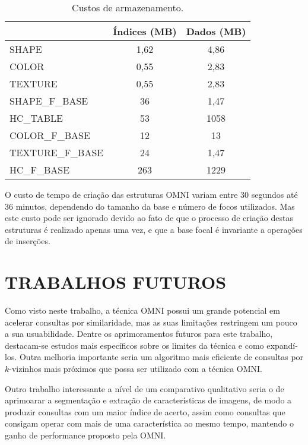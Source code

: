 \begin{table}[H]
    \centering
    \caption[Custos de armazenamento]{Custos de armazenamento.
    \label{tab:custos}}
   \begin{tabular}{l c c}
        \toprule
             &Índices (MB)& Dados (MB)\\
        \midrule
            SHAPE & 1,62& 4,86 \\
            COLOR & 0,55& 2,83 \\
            TEXTURE & 0,55& 2,83 \\
            SHAPE\_F\_BASE & 36& 1,47 \\
            HC\_TABLE & 53& 1058 \\
            COLOR\_F\_BASE & 12& 13 \\
            TEXTURE\_F\_BASE & 24& 1,47 \\
            HC\_F\_BASE & 263& 1229 \\
        \bottomrule
    \end{tabular}
\end{table}

O custo de tempo de criação das estruturas OMNI variam entre 30 segundos até 36 minutos, dependendo do tamanho da base e número de focos
utilizados. Mas este custo pode ser ignorado devido ao fato de que o processo de criação destas estruturas é realizado apenas uma vez,
e que a base focal é invariante a operações de inserções.

\section{TRABALHOS FUTUROS}
\label{sec:trabalhosFuturos}

Como visto neste trabalho, a técnica OMNI possui um grande potencial em acelerar consultas por similaridade, mas as suas limitações restringem um pouco a sua usuabilidade. Dentre os aprimoramentos futuros para este trabalho, destacam-se estudos mais específicos
sobre os limites da técnica e como expandí-los. Outra melhoria importante seria um algoritmo mais eficiente de consultas por $k$-vizinhos mais próximos que possa ser utilizado com a técnica OMNI.

Outro trabalho interessante a nível de um comparativo qualitativo seria o de aprimoarar a segmentação e extração de características de imagens, de modo a produzir consultas com um maior índice de acerto, assim
como consultas que consigam operar com mais de uma característica ao mesmo tempo, mantendo o ganho de performance proposto pela OMNI.

